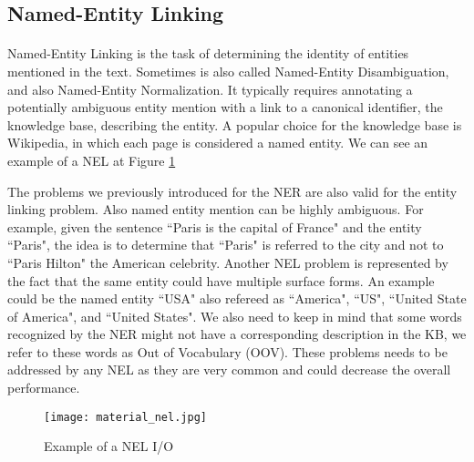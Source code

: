 \subsection{Named-Entity Linking}
\paragraph{}
Named-Entity Linking is the task of determining the identity of entities mentioned in the text. Sometimes is also called Named-Entity Disambiguation, and also Named-Entity Normalization. It typically requires annotating a potentially ambiguous entity mention with a link to a canonical identifier, the knowledge base, describing the entity. A popular choice for the knowledge base is Wikipedia, in which each page is considered a named entity. We can see an example of a NEL at Figure \ref{fig:nel_io} 


The problems we previously introduced for the NER are also valid for the entity linking problem. Also named entity mention can be highly ambiguous. For example, given the sentence ``Paris is the capital of France" and the entity ``Paris", the idea is to determine that ``Paris" is referred to the city and not to ``Paris Hilton" the American celebrity. Another NEL problem is represented by the fact that the same entity could have multiple surface forms. An example could be the named entity ``USA" also refereed as ``America", ``US", ``United State of America", and ``United States". We also need to keep in mind that some words recognized by the NER might not have a corresponding description in the KB, we refer to these words as Out of Vocabulary (OOV). These problems needs to be addressed by any NEL as they are very common and could decrease the overall performance.

\vspace{-10pt}
\begin{figure}[ht]
\texttt{[image: material\_nel.jpg]}
\caption{Example of a NEL I/O}
\label{fig:nel_io}
\end{figure}
\vspace{-10pt}


